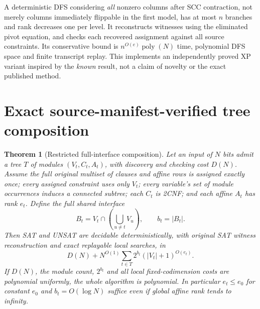 \documentclass[11pt]{article}
\newtheorem{theorem}{Theorem}
\begin{document}
A deterministic DFS considering \emph{all} nonzero columns after
SCC contraction, not merely columns immediately flippable in the
first model, has at most $n$ branches and rank decreases one per level.
It reconstructs witnesses using the eliminated pivot equation,
and checks each recovered assignment against all source constraints.
Its conservative bound is $n^{O(e)}\operatorname{poly}(N)$ time,
polynomial DFS space and finite transcript replay.
This implements an independently proved XP variant inspired by the
\emph{known} result, not a claim of novelty or the exact published method.

\section{Exact source-manifest-verified tree composition}
\begin{theorem}[Restricted full-interface composition]
Let an input of $N$ bits admit a tree $T$ of modules
$(V_t,C_t,A_t)$, with discovery and checking cost $D(N)$.
Assume the full original multiset of clauses and affine rows
is assigned exactly once; every assigned constraint uses only $V_t$;
every variable's set of module occurrences induces a connected subtree;
each $C_t$ is 2CNF; and each affine $A_t$ has rank $e_t$.
Define the \emph{full} shared interface
\[
B_t=V_t\cap\left(\bigcup_{u\ne t}V_u\right),\qquad b_t=|B_t|.
\]
Then SAT and UNSAT are decidable deterministically, with original SAT
witness reconstruction and exact replayable local searches, in
\[
\boxed{D(N)+N^{O(1)}\sum_{t\in T}2^{b_t}(|V_t|+1)^{O(e_t)}}.
\]
If $D(N)$, the module count, $2^{b_t}$ and all local fixed-codimension
costs are polynomial uniformly, the whole algorithm is polynomial.
In particular $e_t\le e_0$ for constant $e_0$ and $b_t=O(\log N)$
suffice even if global affine rank tends to infinity.
\end{theorem}
\end{document}
